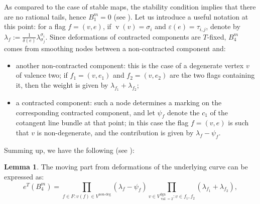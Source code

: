 \documentclass[11pt]{amsart}
\newcommand{\val}{\operatorname{val}}
\newcommand{\vv}{\operatorname{v}}
\theoremstyle{definition}
\newtheorem{lem}[thm]{Lemma}
\theoremstyle{definition}
\begin{document}
As compared to the case of stable maps, the stability condition implies that there are no rational tails, hence $B_1^m=0$ (see \cite[Lemma 7.2]{HolgerSpielberg}). 
Let us introduce a useful notation at this point: for a flag $f=(v,e)$, if $\vv(v)=\sigma_i$ and $\varepsilon(e)=\tau_{i,j}$, denote by $\lambda_f:=\frac{1}{\delta(e)}\lambda^{\sigma_i}_{\sigma_j}$.
Since deformations of contracted components are $T$-fixed, $B_4^m$ comes from smoothing nodes between a non-contracted component and:
\begin{itemize}
 \item another non-contracted component: this is the case of a degenerate vertex $v$ of valence two; if $f_1=(v,e_1)$ and $f_2=(v,e_2)$ are the two flags containing it, then the weight is given by $\lambda_{f_1}+\lambda_{f_2}$;
 \item a contracted component: such a node determines a marking on the corresponding contracted component, and let $\psi_f$ denote the $c_1$ of the cotangent line bundle at that point; in this case the flag $f=(v,e)$ is such that $v$ is non-degenerate, and the contribution is given by $\lambda_f-\psi_f$.
\end{itemize}
Summing up, we have the following (see \cite[Lemma 7.3]{HolgerSpielberg}):
\begin{lem}
 The moving part from deformations of the underlying curve can be expressed as:
 \[
  e^T(B_4^m)=\prod_{f\in F\colon v(f)\in V^{\text{non-deg}}}(\lambda_f-\psi_f)\prod_{v\in V^\text{dgn}_{\val=2}\colon v\in f_1,f_2}(\lambda_{f_1}+\lambda_{f_2}),
 \]
\end{lem}
\end{document}
